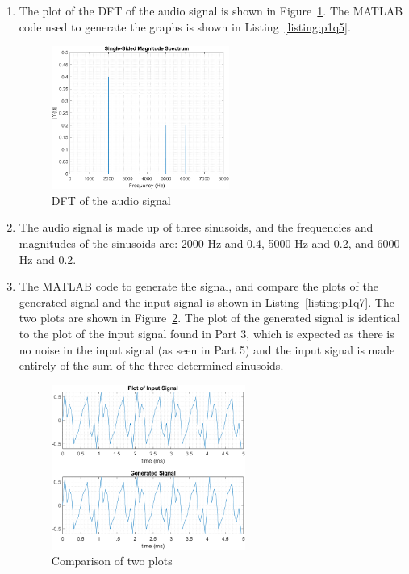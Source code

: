 \documentclass[12pt]{article}
\begin{document}
\begin{enumerate}
    \item The plot of the DFT of the audio signal is shown in Figure~\ref{fig:p1q5}. The MATLAB code used to generate the graphs is shown in Listing~\ref{listing:p1q5}.
    \begin{figure}[ht]
        \centering
        \includegraphics[width=0.55\textwidth]{part1q5.png}
        \caption{\label{fig:p1q5}DFT of the audio signal}
    \end{figure}
    

    \item The audio signal is made up of three sinusoids, and the frequencies and magnitudes of the sinusoids are: 2000 Hz and 0.4, 5000 Hz and 0.2, and 6000 Hz and 0.2.

    \item The MATLAB code to generate the signal, and compare the plots of the generated signal and the input signal is shown in Listing~\ref{listing:p1q7}. The two plots are shown in Figure~\ref{fig:p1q7}. The plot of the generated signal is identical to the plot of the input signal found in Part 3, which is expected as there is no noise in the input signal (as seen in Part 5) and the input signal is made entirely of the sum of the three determined sinusoids.
    
    \begin{figure}[ht]
        \centering
        \includegraphics[width=0.6\textwidth]{part1q7.png}
        \caption{\label{fig:p1q7}Comparison of two plots}
    \end{figure}

\end{enumerate}
\newpage
\end{document}
